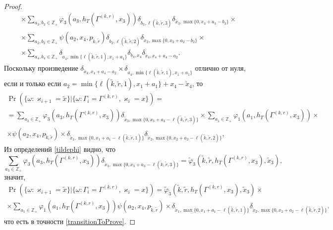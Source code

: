 \documentclass[a4paper,12pt,russian]{extarticle}
\begin{document}
\begin{proof}
\begin{multline*}
\times \sum_{a_3,b_3 \in \mathbb{Z}_+}  \varphi_3(a_3,h_T(\Gamma^{(k,r)},x_3)) \delta_{b_3,\ell(\tilde{k},\tilde{r},3)}  \delta_{\tilde{x}_3,\max{\{0,x_3+a_3-b_3\}}} \times \\
\times \sum_{a_2,b_2 \in \mathbb{Z}_+}  \psi(a_2,x_4, p_{\tilde{k},\tilde{r}})   \delta_{b_2,\ell(\tilde{k},\tilde{r},2)}   \delta_{\tilde{x}_2,\max{\{0,x_2+a_2-b_2\}}} \times \\
\times \sum_{a_4,b_4 \in \mathbb{Z}_+}  \delta_{a_4,\min{\{\ell(\tilde{k},\tilde{r},1), x_1+a_1}\}}   \delta_{b_4,x_4} \delta_{\tilde{x}_4,x_4+a_4-a_2}.
\end{multline*}
Поскольку произведение $\delta_{\tilde{x}_4,x_4+a_4-a_2}\times \delta_{a_4,\min{\{\ell(\tilde{k},\tilde{r},1), x_1+a_1}\}}$ отлично от нуля, если и только если $a_2 = \min{\{\ell(\tilde{k},\tilde{r},1), x_1+a_1}\} +x_4-\tilde{x}_4$, то
\begin{multline*}
\Pr (\{\omega\colon\varkappa_{i+1}=\tilde{x}\}|\{\omega\colon\Gamma_{i}=\Gamma^{(k,r)},\varkappa_i=x\})=\\=\sum_{a_3\in \mathbb{Z}_+}  \varphi_3(a_3,h_T(\Gamma^{(k,r)},x_3))  \delta_{\tilde{x}_3,\max{\{0,x_3+a_3-\ell(\tilde{k},\tilde{r},3)\}}} 
\times\sum_{a_1 \in \mathbb{Z}_+} \varphi_1(a_1,h_T(\Gamma^{(k,r)},x_3))  \times \\ \times \psi(a_2,x_4, p_{\tilde{k},\tilde{r}}) 
\times \delta_{\tilde{x}_1,\max{\{0,x_1+a_1-\ell(\tilde{k},\tilde{r},1)\}}}  \delta_{\tilde{x}_2,\max{\{0,x_2+a_2-\ell(\tilde{k},\tilde{r},2)\}}},
\end{multline*}
Из определений \eqref{tildephi} видно, что
\begin{equation*}
\sum_{a_3\in \mathbb{Z}_+}  \varphi_3(a_3,h_T(\Gamma^{(k,r)},x_3))  \delta_{\tilde{x}_3,\max{\{0,x_3+a_3-\ell(\tilde{k},\tilde{r},3)\}}} = \tilde{\varphi}_3(\tilde{k},\tilde{r},h_T(\Gamma^{(k,r)},x_3),\tilde{x}_3),
\end{equation*}
значит,
\begin{multline*}
\Pr (\{\omega\colon\varkappa_{i+1}=\tilde{x}\}|\{\omega\colon\Gamma_{i}=\Gamma^{(k,r)},\varkappa_i=x\})
=\tilde{\varphi}_3(\tilde{k},\tilde{r},h_T(\Gamma^{(k,r)},x_3),\tilde{x}_3) \times\\
\times \sum_{a_1 \in \mathbb{Z}_+} \varphi_1(a_1,h_T(\Gamma^{(k,r)},x_3))  \psi(a_2,x_4, p_{\tilde{k},\tilde{r}}) \times \delta_{\tilde{x}_1,\max{\{0,x_1+a_1-\ell(\tilde{k},\tilde{r},1)\}}}  \delta_{\tilde{x}_2,\max{\{0,x_2+a_2-\ell(\tilde{k},\tilde{r},2)\}}}.
\end{multline*}
что есть в точности \eqref{transitionToProve}.
\end{proof}
\end{document}
